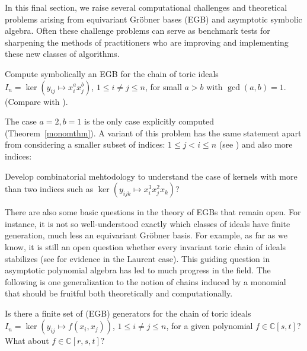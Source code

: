 
In this final section, we raise several computational challenges and theoretical problems arising from equivariant Gr\"obner bases (EGB) and asymptotic symbolic algebra.  Often these challenge problems can serve as benchmark tests for sharpening the methods of practitioners who are improving and implementing these new classes of algorithms.

\begin{problem}
Compute symbolically an EGB for the chain of toric ideals $I_n = \ker(y_{ij} \mapsto x_i^a x_j^b)$, $1 \leq i \neq j \leq n$, for small $a>b$ with $\gcd(a,b)=1$. (Compare with \cite{Hillar13, hillar2016corrigendum, KKL:equivariant-markov, draisma2013noetherianity, Krone:egb-toric}).
\end{problem}

The case $a=2,b=1$ is the only case explicitly computed (Theorem~\ref{monomthm}). A variant of this problem has the same statement apart from considering a smaller subset of indices: $1 \leq j < i \leq n$ (see \cite[Remark 6.3]{draisma2013noetherianity}) and also more indices:

\begin{problem}
Develop combinatorial mehtodology to understand the case of kernels with more than two indices such as $\ker(y_{ijk} \mapsto x_i^3 x_j^2 x_k)$?  
\end{problem}

There are also some basic questions in the theory of EGBs that remain open.  For instance, it is not so well-understood exactly which classes of ideals have finite generation, much less an equivariant Gr\"obner basis.  For example, as far as we know, it is still an open question whether every invariant toric chain of ideals stabilizes (see \cite{Hillar13} for evidence in the Laurent case).  This guiding question in asymptotic polynomial algebra has led to much progress in the field.  The following is one generalization to the notion of chains induced by a monomial that should be fruitful both theoretically and computationally.

\begin{problem}
Is there a finite set of (EGB) generators for the chain of toric ideals $I_n = \ker(y_{ij} \mapsto f(x_i,x_j))$, $1 \leq i \neq j \leq n$, for a given polynomial $f \in \mathbb C[s,t]$?  What about $f \in \mathbb C[r, s,t]?$
\end{problem}

